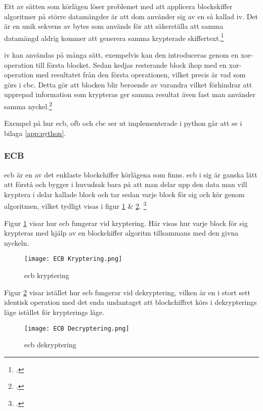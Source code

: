 Ett av sätten som körlägen löser problemet med att applicera blockskiffer algoritmer på
större datamängder är att dom använder sig av en så kallad \acrfull{iv}. Det är en unik sekvens
av bytes som används för att säkerställa att samma datamängd aldrig kommer att generera samma
krypterade skiffertext.\footcite{dworkin2001sp}

\acrshort{iv} kan användas på många sätt, exempelvis kan den introduceras genom en
\gls{xor}-operation till första blocket. Sedan kedjas resterande block ihop med en \gls{xor}-operation med resultatet från
den första operationen, vilket precis är vad som görs i \acrshort{cbc}. Detta gör att blocken blir beroende av varandra
vilket förhindrar att upprepad information som krypteras ger samma resultat även fast man använder samma
nyckel.\footcite{dworkin2001sp}

Exempel på hur \acrshort{ecb}, \acrshort{ofb} och \acrshort{cbc} ser ut implementerade i \gls{python} går att se i bilaga \ref{app:python}.

\subsubsection{ECB}
\label{sec:ecb}
\acrfull{ecb} är en av det enklaste blockchiffer körlägena som finns.
\acrshort{ecb} i sig är ganska lätt att förstå och bygger i huvudsak bara på
att man delar upp den data man vill kryptera i delar kallade block och tar sedan varje
block för sig och kör genom algoritmen, vilket tydligt visas i
figur \ref{fig:ecb-mode-enc} \& \ref{fig:ecb-mode-dec}.
\footcite{dworkin2001sp}

Figur \ref{fig:ecb-mode-enc} visar hur \acrshort{ecb} fungerar vid kryptering.
Här visas hur varje block för sig krypteras med hjälp av en blockchiffer algoritm
tillsammans med den givna nyckeln.

\begin{figure}[H]
    \texttt{[image: ECB Kryptering.png]}
    \caption{\acrlong{ecb} kryptering}
    \label{fig:ecb-mode-enc}
\end{figure}

Figur \ref{fig:ecb-mode-dec} visar istället hur \acrshort{ecb} fungerar vid
dekryptering, vilken är en i stort sett identisk operation med det enda undantaget
att blockchiffret körs i dekrypterings läge istället för krypterings läge.

\begin{figure}[H]
    \texttt{[image: ECB Decryptering.png]}
    \caption{\acrlong{ecb} dekryptering}
    \label{fig:ecb-mode-dec}
\end{figure}

